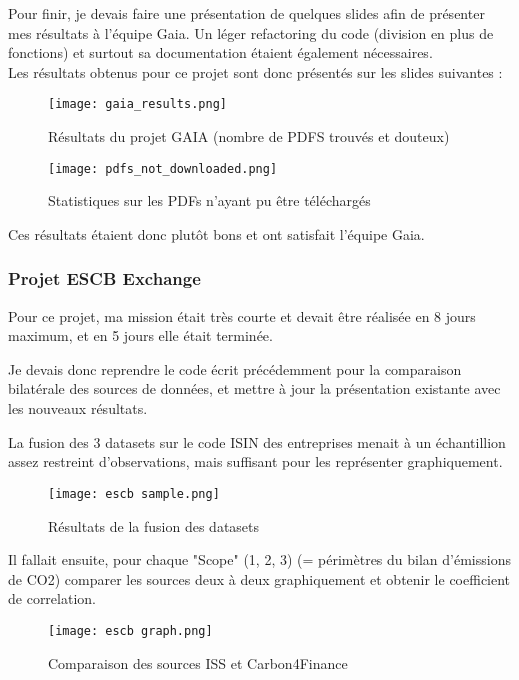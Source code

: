 Pour finir, je devais faire une présentation de quelques slides afin de présenter mes résultats à l'équipe Gaia.
Un léger refactoring du code (division en plus de fonctions) et surtout sa documentation étaient également nécessaires. 
\\
Les résultats obtenus pour ce projet sont donc présentés sur les slides suivantes :

\begin{figure}[H]
    \centering
    \texttt{[image: gaia\_results.png]}
    \caption{Résultats du projet GAIA (nombre de PDFS trouvés et douteux)}
\end{figure}

\begin{figure}[H]
    \centering
    \texttt{[image: pdfs\_not\_downloaded.png]}
    \caption{Statistiques sur les PDFs n'ayant pu être téléchargés}
\end{figure}

Ces résultats étaient donc plutôt bons et ont satisfait l'équipe Gaia.
 
\subsubsection{Projet ESCB Exchange}

Pour ce projet, ma mission était très courte et devait être réalisée en 8 jours maximum, et en 5 jours elle était terminée. 

Je devais donc reprendre le code écrit précédemment pour la comparaison bilatérale des sources de données, et mettre à jour la présentation existante avec les nouveaux résultats.

La fusion des 3 datasets sur le code ISIN des entreprises menait à un échantillion assez restreint d'observations, mais suffisant pour les représenter graphiquement.

\begin{figure}[H]
    \centering
    \texttt{[image: escb sample.png]}
    \caption{Résultats de la fusion des datasets}
\end{figure}

Il fallait ensuite, pour chaque "Scope" (1, 2, 3) (= périmètres du bilan d'émissions de CO2) comparer les sources deux à deux graphiquement et obtenir le coefficient de correlation.

\begin{figure}[H]
    \centering
    \texttt{[image: escb graph.png]}
    \caption{Comparaison des sources ISS et Carbon4Finance}
\end{figure}

